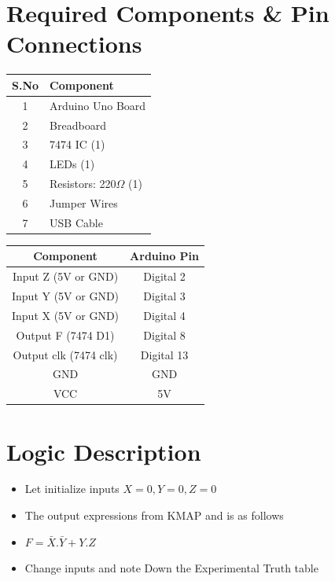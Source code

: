 \documentclass[a4paper,12pt]{article}
\begin{document}
\section*{Required Components \& Pin Connections}
\begin{center}
\begin{minipage}{0.45\textwidth}
\begin{table}[H]
\centering
\begin{tabular}{|c|l|}
\hline
\textbf{S.No} & \textbf{Component} \\ \hline
1 & Arduino Uno Board \\
2 & Breadboard \\
3 & 7474 IC (1) \\
4 & LEDs (1) \\
5 & Resistors: 220$\Omega$ (1) \\
6 & Jumper Wires \\
7 & USB Cable \\
\hline
\end{tabular}
\end{table}
\end{minipage}
\hspace{0.05\textwidth}
\begin{minipage}{0.45\textwidth}
\begin{table}[H]
\centering
\begin{tabular}{|c|c|}
\hline
\textbf{Component} & \textbf{Arduino Pin} \\ \hline
Input Z (5V or GND) & Digital 2 \\
Input Y (5V or GND) & Digital 3 \\
Input X (5V or GND) & Digital 4 \\
Output F (7474 D1) & Digital 8 \\
Output clk (7474 clk) & Digital 13 \\
GND & GND \\
VCC & 5V \\
\hline
\end{tabular}
\end{table}
\end{minipage}
\end{center}
\section*{Logic Description}
\begin{itemize}
        \item Let initialize inputs $X=0,Y=0,Z=0$
        \item The output expressions from KMAP and is as follows
	\item $F=\bar{X}.\bar{Y}+Y.Z$
	\item Change inputs and note Down the Experimental Truth table
\end{itemize}
\end{document}
